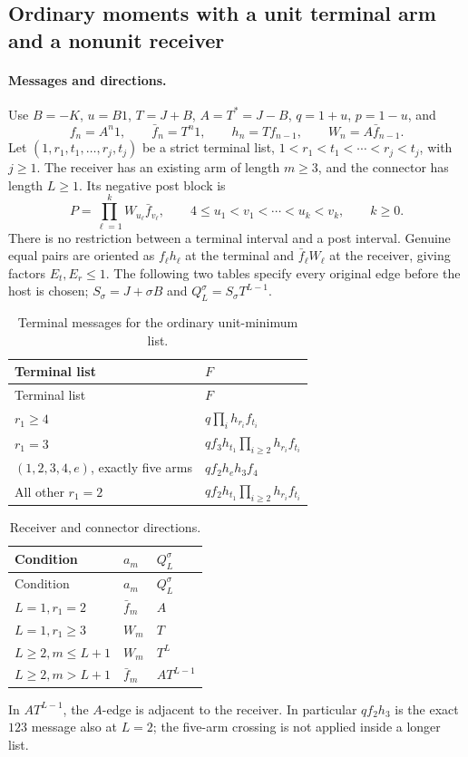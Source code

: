 \subsection{Ordinary moments with a unit terminal arm and a nonunit receiver}
\label{proof:R2-C040}
\paragraph{Messages and directions.}\label{part:R40.1}
Use \(B=-K\), \(u=B1\), \(T=J+B\), \(A=T^*=J-B\),
\(q=1+u\), \(p=1-u\), and
\[
 f_n=A^n1,\qquad \bar f_n=T^n1,\qquad
 h_n=Tf_{n-1},\qquad W_n=A\bar f_{n-1}.
\]
Let \((1,r_1,t_1,\ldots,r_j,t_j)\) be a strict terminal list,
\(1<r_1<t_1<\cdots<r_j<t_j\), with \(j\ge1\).
The receiver has an existing arm of length \(m\ge3\), and the
connector has length \(L\ge1\). Its negative post block is
\[
 P=\prod_{\ell=1}^kW_{u_\ell}\bar f_{v_\ell},
 \qquad4\le u_1<v_1<\cdots<u_k<v_k,\qquad k\ge0.
 \tag{R40.1.3}
\]
There is no restriction between a terminal interval and a post interval.
Genuine equal pairs are oriented as \(f_\ell h_\ell\) at the terminal
and \(\bar f_\ell W_\ell\) at the receiver, giving factors \(E_t,E_r\le1\).
The following two tables specify every original edge before the host is
chosen; \(S_\sigma=J+\sigma B\) and \(Q_L^\sigma=S_\sigma T^{L-1}\).

\begingroup\small\setlength{\tabcolsep}{3pt}
\begin{longtable}{@{}p{.31\linewidth}p{.64\linewidth}@{}}
\caption{Terminal messages for the ordinary unit-minimum list.}
\label{tab:r40:terminal-directions}\\
\toprule Terminal list & \(F\)\\\midrule\endfirsthead
\toprule Terminal list & \(F\)\\\midrule\endhead
\bottomrule\endfoot
\(r_1\ge4\)&\(q\prod_i h_{r_i}f_{t_i}\)\\
\(r_1=3\)&\(qf_3h_{t_1}\prod_{i\ge2}h_{r_i}f_{t_i}\)\\
\((1,2,3,4,e)\), exactly five arms&\(qf_2h_eh_3f_4\)\\
All other \(r_1=2\)&\(qf_2h_{t_1}\prod_{i\ge2}h_{r_i}f_{t_i}\)\\
\end{longtable}
\begin{longtable}{@{}p{.45\linewidth}p{.21\linewidth}p{.23\linewidth}@{}}
\caption{Receiver and connector directions.}\label{tab:r40:receiver-directions}\\
\toprule Condition&\(a_m\)&\(Q_L^\sigma\)\\\midrule\endfirsthead
\toprule Condition&\(a_m\)&\(Q_L^\sigma\)\\\midrule\endhead
\bottomrule\endfoot
\(L=1,r_1=2\)&\(\bar f_m\)&\(A\)\\
\(L=1,r_1\ge3\)&\(W_m\)&\(T\)\\
\(L\ge2,m\le L+1\)&\(W_m\)&\(T^L\)\\
\(L\ge2,m>L+1\)&\(\bar f_m\)&\(AT^{L-1}\)\\
\end{longtable}
\endgroup
In \(AT^{L-1}\), the \(A\)-edge is adjacent to the receiver.
In particular \(qf_2h_3\) is the exact \(123\) message also at \(L=2\);
the five-arm crossing is not applied inside a longer list.

